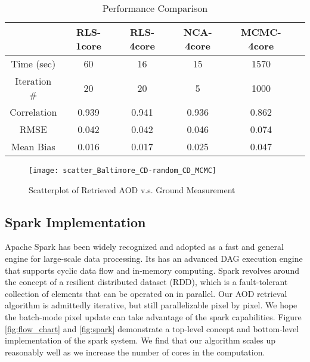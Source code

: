 \begin{table}[h!]
    \caption{Performance Comparison}
    \label{tab:performance}
    \begin{center}
        \begin{tabular}{|c|c|c|c|c|c|}
            \hline
            & RLS-1core & RLS-4core & NCA-4core & MCMC-4core\\
            \hline
            \hline
            Time (sec) & 60 & 16 & 15 &  1570 \\
            \hline
            Iteration \# & 20 & 20 & 5 & 1000 \\
            \hline
            Correlation & 0.939 & 0.941 & 0.936 & 0.862 \\
            \hline
            RMSE & 0.042 & 0.042 & 0.046 & 0.074 \\
            \hline
            Mean Bias & 0.016 &  0.017 & 0.025 & 0.047 \\
            \hline
        \end{tabular}
    \end{center}
\end{table}

\begin{figure}[h!]
    \centering
    \texttt{[image: scatter\_Baltimore\_CD-random\_CD\_MCMC]}
    \caption{Scatterplot of Retrieved AOD v.s. Ground Measurement}
    \label{fig:scatter}
\end{figure}

\label{parallel}


\subsection{Spark Implementation}
Apache Spark has been widely recognized and adopted as a fast and general engine for large-scale data processing. Its has an advanced DAG execution engine that supports cyclic data flow and in-memory computing. Spark revolves around the concept of a resilient distributed dataset (RDD), which is a fault-tolerant collection of elements that can be operated on in parallel. Our AOD retrieval algorithm is admittedly iterative, but still parallelizable pixel by pixel. We hope the batch-mode pixel update can take advantage of the spark capabilities. Figure \ref{fig:flow_chart} and \ref{fig:spark} demonstrate a top-level concept and bottom-level implementation of the spark system. We find that our algorithm scales up reasonably well as we increase the number of cores in the computation.

